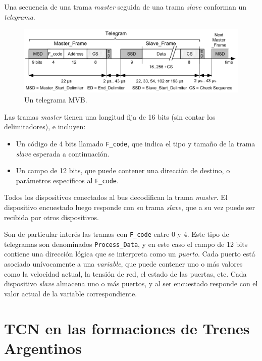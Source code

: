 Una secuencia de una trama \textit{master} seguida de una trama \textit{slave} conforman un \textit{telegrama}.

\begin{figure}[htbp]
	\centering
	\includegraphics[width=1\textwidth]{./Figures/telegrama.png}
	\caption[Un telegrama MVB]{Un telegrama MVB.
        \\ }
\end{figure}

Las tramas \textit{master} tienen una longitud fija de 16 bits (sin contar los delimitadores), e incluyen:

\begin{itemize}
\item Un código de 4 bits llamado \texttt{F\_code}, que indica el tipo y tamaño de la trama \textit{slave} esperada a continuación.
\item Un campo de 12 bits, que puede contener una dirección de destino, o parámetros específicos al \texttt{F\_code}.
\end{itemize}

Todos los dispositivos conectados al bus decodifican la trama \textit{master}. El dispositivo encuestado luego responde con su trama \textit{slave}, que a su vez puede ser recibida por otros dispositivos.

Son de particular interés las tramas con \texttt{F\_code} entre 0 y 4. Este tipo de telegramas son denominados \texttt{Process\_Data}, y en este caso el campo de 12 bits contiene una dirección lógica que se interpreta como un \textit{puerto}. Cada puerto está asociado unívocamente a una \textit{variable}, que puede contener uno o más valores como la velocidad actual, la tensión de red, el estado de las puertas, etc. Cada dispositivo \textit{slave} almacena uno o más puertos, y al ser encuestado responde con el valor actual de la variable correspondiente.

\section{TCN en las formaciones de Trenes Argentinos}

